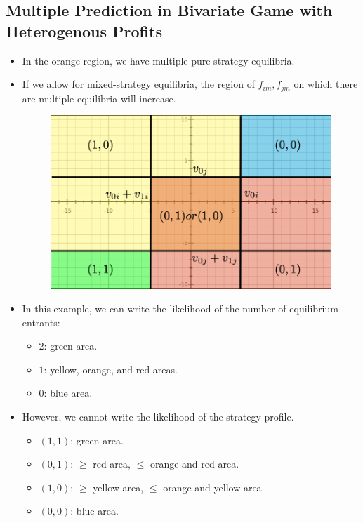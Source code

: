 \documentclass[]{book}
\providecommand{\tightlist}{%
  \setlength{\itemsep}{0pt}\setlength{\parskip}{0pt}}
\begin{document}
\subsection{Multiple Prediction in Bivariate Game with Heterogenous
Profits}\label{multiple-prediction-in-bivariate-game-with-heterogenous-profits}

\begin{itemize}
\tightlist
\item
  In the orange region, we have multiple pure-strategy equilibria.
\item
  If we allow for mixed-strategy equilibria, the region of
  \(f_{im}, f_{jm}\) on which there are multiple equilibria will
  increase.

  \begin{figure}
  \includegraphics[width=0.8\linewidth]{figuretable/bivariateentry} \end{figure}
\item
  In this example, we can write the likelihood of the number of
  equilibrium entrants:

  \begin{itemize}
  \tightlist
  \item
    \(2\): green area.
  \item
    \(1\): yellow, orange, and red areas.
  \item
    \(0\): blue area.
  \end{itemize}
\item
  However, we cannot write the likelihood of the strategy profile.

  \begin{itemize}
  \tightlist
  \item
    \((1, 1)\): green area.
  \item
    \((0, 1)\): \(\ge\) red area, \(\le\) orange and red area.
  \item
    \((1, 0)\): \(\ge\) yellow area, \(\le\) orange and yellow area.
  \item
    \((0, 0)\): blue area.
  \end{itemize}
\end{itemize}
\end{document}
